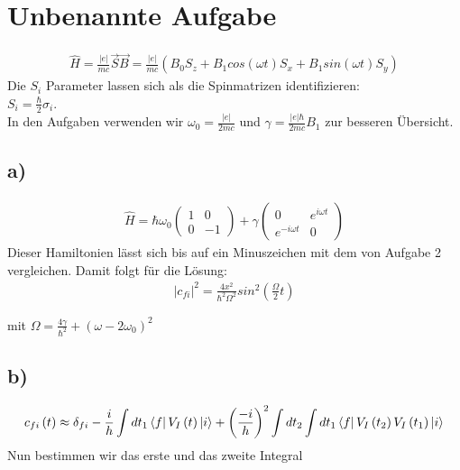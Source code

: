 \section{Unbenannte Aufgabe}

\begin{align}
\hat{H} = \frac{|e|}{mc} \vec{S} \vec{B} = \frac{|e|}{mc} \left( B_0 S_z + B_1 cos \left( \omega t \right) S_x + B_1 sin \left( \omega t \right) S_y \right)
\end{align}
Die $S_i$ Parameter lassen sich als die Spinmatrizen identifizieren:\\
$S_i = \frac{\hbar}{2} \sigma_i$.\\
In den Aufgaben verwenden wir $\omega_0 = \frac{|e|}{2mc}$ und $\gamma = \frac{|e| \hbar}{2mc} B_1$ zur besseren \"Ubersicht.

\subsection{a)}

\begin{align}
\hat{H} = \hbar \omega_0
\begin{pmatrix}
1 & 0 \\ 0 & -1
\end{pmatrix}
+ \gamma
\begin{pmatrix}
0 & e^{i \omega t} \\ e^{-i \omega t} & 0
\end{pmatrix}
\end{align}
 Dieser Hamiltonien l\"asst sich bis auf ein Minuszeichen mit dem von Aufgabe 2 vergleichen. Damit folgt f\"ur die L\"osung:
 \begin{align}
 |c_{fi}|^2 = \frac{4x^2}{\hbar^2 \Omega^2} sin^2 \left(\frac{\Omega}{2} t \right)
 \end{align}

mit $\Omega = \frac{4 \gamma}{\hbar^2} + \left( \omega - 2 \omega_0 \right) ^2$

\subsection{b)}

\begin{align}
c_{fi} \left( t \right) \approx \delta_{fi} - \frac{i}{h} \int dt_1 \Bra{f} V_I \left( t \right) \Ket{i} + \left( \frac{-i}{h} \right) ^2 \int dt_2 \int dt_1 \Bra{f} V_I \left( t_2 \right) V_I \left( t_1 \right) \Ket{i}
\end{align}
Nun bestimmen wir das erste und das zweite Integral

